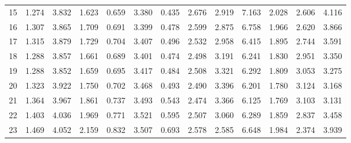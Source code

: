 \begin{tabular}{lrrrrrrrrrrrr}
	15                  & 1.274                          & 3.832                        & 1.623                        & 0.659                      & 3.380 & 0.435     & 2.676         & 2.919 & 7.163     & 2.028         & 2.606 & 4.116     \\
	16                  & 1.307                          & 3.865                        & 1.709                        & 0.691                      & 3.399 & 0.478     & 2.599         & 2.875 & 6.758     & 1.966         & 2.620 & 3.866     \\
	17                  & 1.315                          & 3.879                        & 1.729                        & 0.704                      & 3.407 & 0.496     & 2.532         & 2.958 & 6.415     & 1.895         & 2.744 & 3.591     \\
	18                  & 1.288                          & 3.857                        & 1.661                        & 0.689                      & 3.401 & 0.474     & 2.498         & 3.191 & 6.241     & 1.830         & 2.951 & 3.350     \\
	19                  & 1.288                          & 3.852                        & 1.659                        & 0.695                      & 3.417 & 0.484     & 2.508         & 3.321 & 6.292     & 1.809         & 3.053 & 3.275     \\
	20                  & 1.323                          & 3.922                        & 1.750                        & 0.702                      & 3.468 & 0.493     & 2.490         & 3.396 & 6.201     & 1.780         & 3.124 & 3.168     \\
	21                  & 1.364                          & 3.967                        & 1.861                        & 0.737                      & 3.493 & 0.543     & 2.474         & 3.366 & 6.125     & 1.769         & 3.103 & 3.131     \\
	22                  & 1.403                          & 4.036                        & 1.969                        & 0.771                      & 3.521 & 0.595     & 2.507         & 3.060 & 6.289     & 1.859         & 2.837 & 3.458     \\
	23                  & 1.469                          & 4.052                        & 2.159                        & 0.832                      & 3.507 & 0.693     & 2.578         & 2.585 & 6.648     & 1.984         & 2.374 & 3.939     \\
	\bottomrule
\end{tabular}
